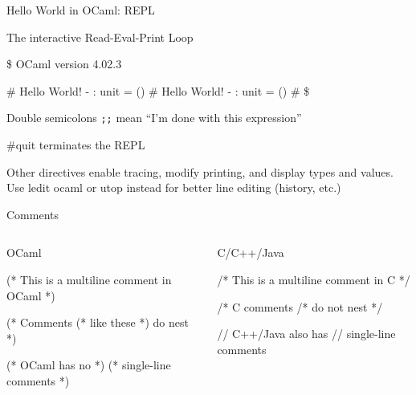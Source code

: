 \documentclass{plt}
\begin{document}
\begin{frame}[fragile]{Hello World in OCaml: REPL}

  The interactive Read-Eval-Print Loop

\begin{interactive}
\$ 
        OCaml version 4.02.3

# 
Hello World!
- : unit = ()
# 
Hello World!
- : unit = ()
# 
\$
\end{interactive}
%
Double semicolons \verb|;;| mean ``I'm done with this expression''

\#quit terminates the REPL

Other directives enable tracing, modify printing, and display types
and values. Use \alert{ledit ocaml} or \alert{utop} instead for better line
editing (history, etc.)

\end{frame}


\begin{frame}[fragile]{Comments}

  \begin{columns}
    \begin{column}[t]{0.5\textwidth}
OCaml
\begin{ocaml}
(* This is a multiline
   comment in OCaml *)

(* Comments
    (* like these *)
   do nest
*)

(* OCaml has no *)
(* single-line comments *)
\end{ocaml}
    \end{column}
    \begin{column}[t]{0.5\textwidth}
C/C++/Java
\begin{C}
/* This is a multiline
   comment in C */

/* C comments
     /* do not
   nest
 */

// C++/Java also has
// single-line comments
\end{C}
    \end{column}
  \end{columns}
\end{frame}
\end{document}
